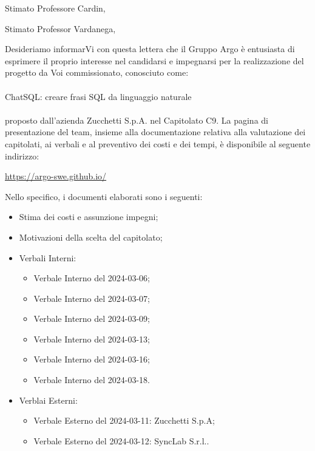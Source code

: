 





\makeFrontPage

Stimato Professore Cardin, \newline

Stimato Professor Vardanega, \newline

Desideriamo informarVi con questa lettera che il Gruppo Argo è entusiasta di esprimere il proprio interesse nel candidarsi e impegnarsi per la realizzazione del progetto da Voi commissionato, conosciuto come: \\
\\
\quad ChatSQL: creare frasi SQL da linguaggio naturale \\
\\
proposto dall’azienda Zucchetti S.p.A. nel Capitolato C9.
La pagina di presentazione del team, insieme alla documentazione relativa alla valutazione dei capitolati, ai verbali e al preventivo dei costi e dei tempi, è disponibile al seguente indirizzo: \newline

\quad \href{https://argo-swe.github.io/}{https://argo-swe.github.io/} \newline

Nello specifico, i documenti elaborati sono i seguenti: 
\begin{itemize}
    \item Stima dei costi e assunzione impegni;
    \item Motivazioni della scelta del capitolato; 
    \item Verbali Interni: 
    \begin{itemize}
        \item Verbale Interno del 2024-03-06;
        \item Verbale Interno del 2024-03-07;
        \item Verbale Interno del 2024-03-09;
        \item Verbale Interno del 2024-03-13;
        \item Verbale Interno del 2024-03-16;
        \item Verbale Interno del 2024-03-18.
    \end{itemize}
    \item Verblai Esterni:
    \begin{itemize}
        \item Verbale Esterno del 2024-03-11: Zucchetti S.p.A;
        \item Verbale Esterno del 2024-03-12: SyncLab S.r.l..
    \end{itemize}
\end{itemize}

